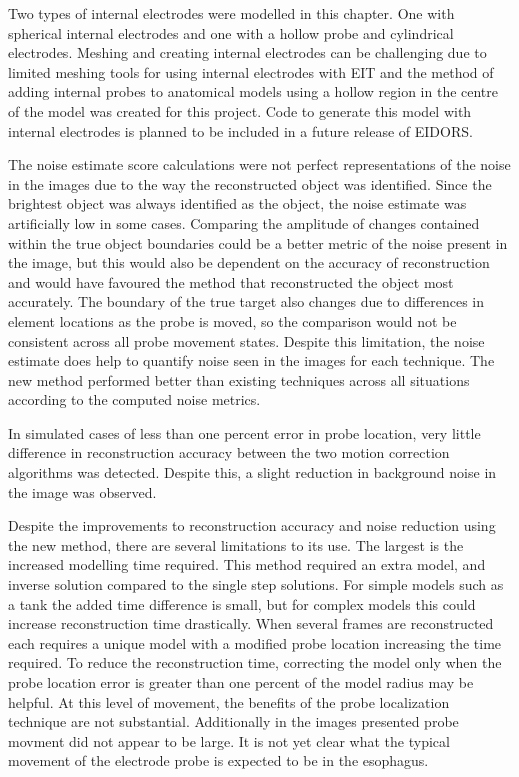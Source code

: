Two types of internal electrodes were modelled in this chapter. One with
spherical internal electrodes and one with a hollow probe and cylindrical electrodes. 
Meshing and creating internal electrodes can be challenging due to limited meshing tools 
for using internal electrodes with EIT and the method of adding internal probes to
anatomical models using a hollow region in the centre of the model was created for this 
project. Code to generate this model with internal electrodes is planned to be included in a
future release of EIDORS.

The noise estimate score calculations were not perfect representations of the noise
in the images due to the way the reconstructed object was identified.  Since the
brightest object was always identified as the object, the noise estimate was
artificially low in some cases. 
Comparing the amplitude of changes contained within the true
object boundaries could be a better metric of the noise present in the image, but this
would also be dependent on the accuracy of reconstruction and would have favoured
the method that reconstructed the object most accurately.
The boundary of the true target
also changes due to differences in element locations as the 
probe is moved, so the comparison would not be consistent across all probe movement
states. Despite this limitation, the noise estimate does help to quantify 
noise seen in the images for each technique. 
The new
method performed better than existing techniques across all situations according to the computed
noise metrics.

In simulated cases of less than one percent error in probe location, very little 
difference in reconstruction accuracy between 
the two motion correction algorithms was detected. 
Despite this, a slight reduction 
in background noise in the image was observed. 

Despite the improvements to reconstruction accuracy 
and noise reduction using the new method, there are several limitations to its use. 
The largest is 
the increased modelling time required. This method required an extra model, and inverse 
solution compared to the single step solutions. For simple models such as 
a tank the added time difference
is small, but for complex models this could increase reconstruction time drastically. 
When several frames are reconstructed each requires a unique model 
with a modified probe location increasing the time required. 
To reduce the reconstruction 
time, correcting the model only when the  probe location error is greater than one 
percent of the model radius may be helpful. At this 
level of movement, the benefits of 
the probe localization technique are 
not substantial. 
Additionally in the images presented probe movment did not 
appear to be large. It is not yet clear what the typical movement of the electrode probe 
is expected to be in the esophagus. 

